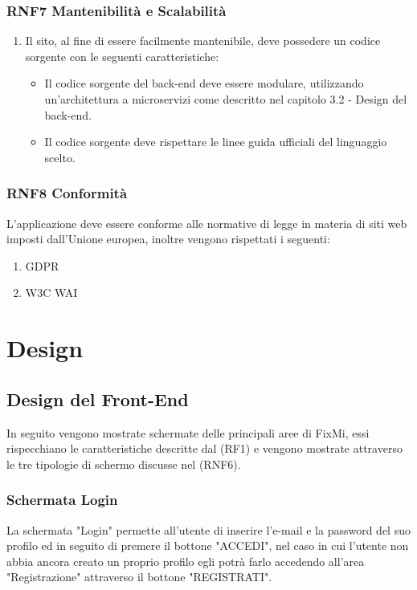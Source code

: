 \documentclass{report}
\begin{document}
\subsection*{RNF7 Mantenibilità e Scalabilità}
\begin{enumerate}
	\item Il sito, al fine di essere facilmente mantenibile, deve possedere un codice sorgente con le seguenti caratteristiche:
	\begin{itemize}
		\item Il codice sorgente del back-end deve essere modulare, utilizzando un'architettura a microservizi come descritto nel capitolo 3.2 - Design del back-end.
		\item Il codice sorgente deve rispettare le linee guida ufficiali del linguaggio scelto.
	
	\end{itemize} 
\end{enumerate}
\subsection*{RNF8 Conformità}
L'applicazione deve essere conforme alle normative di legge in materia di siti web imposti dall'Unione europea, inoltre vengono rispettati i seguenti:
\begin{enumerate}
	\item GDPR
	\item W3C WAI
\end{enumerate}
\chapter{Design}

\section{Design del Front-End}

In seguito vengono mostrate schermate delle principali aree di FixMi, essi rispecchiano le caratteristiche descritte dal (RF1) e vengono mostrate attraverso le tre tipologie di schermo discusse nel (RNF6). 

\subsection*{Schermata Login}

La schermata "Login" permette all'utente di inserire l'e-mail e la password del suo profilo ed in seguito di premere il bottone "ACCEDI", nel caso in cui l'utente non abbia ancora creato un proprio profilo egli potrà farlo accedendo all'area "Registrazione" attraverso il bottone "REGISTRATI".
\end{document}
